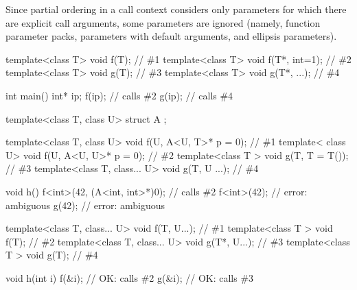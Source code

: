 \pnum
\begin{note} Since partial ordering in a call context considers only parameters
for which there are explicit call arguments, some parameters are ignored (namely,
function parameter packs, parameters with default arguments, and ellipsis
parameters).
\begin{example}

\begin{codeblock}
template<class T> void f(T);                            // \#1
template<class T> void f(T*, int=1);                    // \#2
template<class T> void g(T);                            // \#3
template<class T> void g(T*, ...);                      // \#4

\end{codeblock}
\begin{codeblock}
int main() {
  int* ip;
  f(ip);                                                // calls \#2
  g(ip);                                                // calls \#4
}
\end{codeblock}
\end{example}\begin{example}
\begin{codeblock}
template<class T, class U> struct A { };

template<class T, class U> void f(U, A<U, T>* p = 0);   // \#1
template<         class U> void f(U, A<U, U>* p = 0);   // \#2
template<class T         > void g(T, T = T());          // \#3
template<class T, class... U> void g(T, U ...);         // \#4

void h() {
  f<int>(42, (A<int, int>*)0);                          // calls \#2
  f<int>(42);                                           // error: ambiguous
  g(42);                                                // error: ambiguous
}
\end{codeblock}
\end{example}\begin{example}
\begin{codeblock}
template<class T, class... U> void f(T, U...);          // \#1
template<class T            > void f(T);                // \#2
template<class T, class... U> void g(T*, U...);         // \#3
template<class T            > void g(T);                // \#4

void h(int i) {
  f(&i);                                                // OK: calls \#2
  g(&i);                                                // OK: calls \#3
}
\end{codeblock}
\end{example}\end{note}

